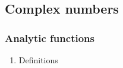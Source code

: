 \subsection{Complex numbers}



\subsubsection{Analytic functions}
\begin{enumerate}
\item Definitions
\end{enumerate}